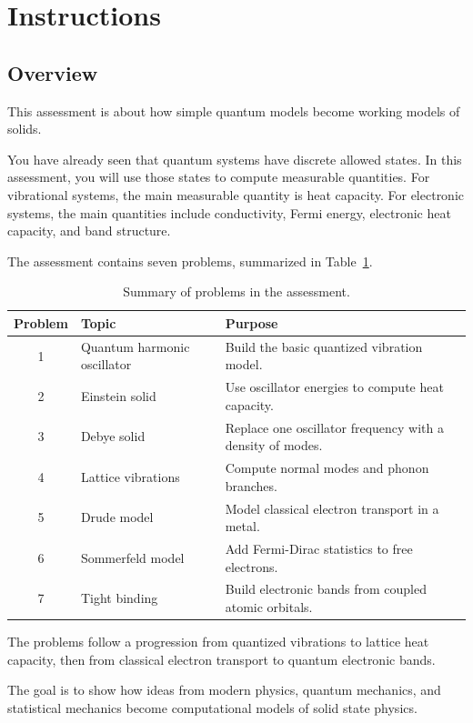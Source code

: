 \section{Instructions}

\subsection{Overview}

This assessment is about how simple quantum models become working models of solids.

You have already seen that quantum systems have discrete allowed states. In this assessment, you will use those states to compute measurable quantities. For vibrational systems, the main measurable quantity is heat capacity. For electronic systems, the main quantities include conductivity, Fermi energy, electronic heat capacity, and band structure.

The assessment contains seven problems, summarized in Table~\ref{tab:assessment-problems}.

\begin{table}[h]
\centering
\caption{Summary of problems in the assessment.}
\label{tab:assessment-problems}
\begin{tabularx}{\textwidth}{clX}
\toprule
Problem & Topic & Purpose \\
\midrule
1 & Quantum harmonic oscillator & Build the basic quantized vibration model. \\
2 & Einstein solid & Use oscillator energies to compute heat capacity. \\
3 & Debye solid & Replace one oscillator frequency with a density of modes. \\
4 & Lattice vibrations & Compute normal modes and phonon branches. \\
5 & Drude model & Model classical electron transport in a metal. \\
6 & Sommerfeld model & Add Fermi-Dirac statistics to free electrons. \\
7 & Tight binding & Build electronic bands from coupled atomic orbitals. \\
\bottomrule
\end{tabularx}
\end{table}

The problems follow a progression from quantized vibrations to lattice heat capacity, then from classical electron transport to quantum electronic bands.

The goal is to show how ideas from modern physics, quantum mechanics, and statistical mechanics become computational models of solid state physics.

